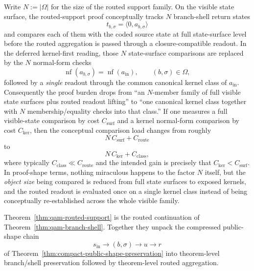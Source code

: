 \begin{remark}\label{rem:qam-kernel-first-routed-savings}
Write $N:=|\Omega|$ for the size of the routed support family. On the visible state surface, the routed-support proof conceptually tracks $N$ branch-shell return states
\[
 t_{b,\sigma}=\langle 0,a_{b,\sigma}\rangle
\]
and compares each of them with the coded source state at full state-surface level before the routed aggregation is passed through a closure-compatible readout. In the deferred kernel-first reading, those $N$ state-surface comparisons are replaced by the $N$ normal-form checks
\[
\operatorname{nf}(a_{b,\sigma})=\operatorname{nf}(a_{\mathrm{in}}),
\qquad (b,\sigma)\in\Omega,
\]
followed by a \emph{single} readout through the common canonical kernel class of $a_{\mathrm{in}}$.
Consequently the proof burden drops from ``an $N$-member family of full visible state surfaces plus routed readout lifting'' to ``one canonical kernel class together with $N$ membership/equality checks into that class.''
If one measures a full visible-state comparison by cost $C_{\mathrm{surf}}$ and a kernel normal-form comparison by cost $C_{\mathrm{ker}}$, then the conceptual comparison load changes from roughly
\[
N\,C_{\mathrm{surf}} + C_{\mathrm{route}}
\]
to
\[
N\,C_{\mathrm{ker}} + C_{\mathrm{class}},
\]
where typically $C_{\mathrm{class}}\ll C_{\mathrm{route}}$ and the intended gain is precisely that $C_{\mathrm{ker}}<C_{\mathrm{surf}}$. In proof-shape terms, nothing miraculous happens to the factor $N$ itself, but the \emph{object size} being compared is reduced from full state surfaces to exposed kernels, and the routed readout is evaluated once on a single kernel class instead of being conceptually re-established across the whole visible family.
\end{remark}

\begin{remark}
Theorem~\ref{thm:qam-routed-support} is the routed continuation of Theorem~\ref{thm:qam-branch-shell}. Together they unpack the compressed public-shape chain
\[
s_{\mathrm{in}} \longrightarrow (b,\sigma) \longrightarrow u \longrightarrow r
\]
of Theorem~\ref{thm:compact-public-shape-preservation} into theorem-level branch/shell preservation followed by theorem-level routed aggregation.
\end{remark}

